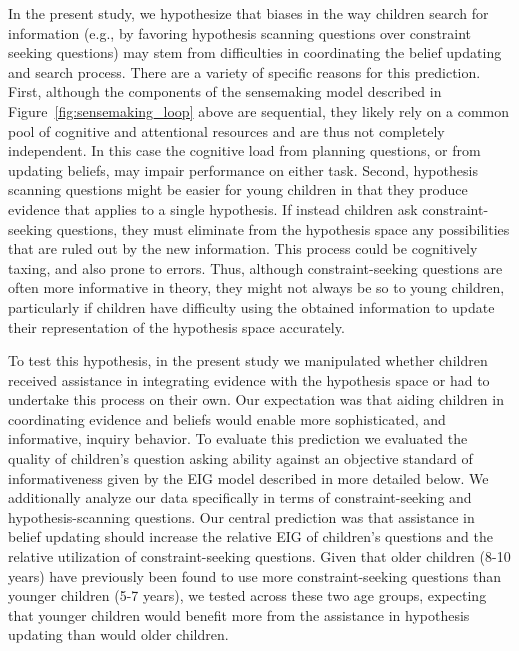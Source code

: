 \documentclass[man,floatsintext]{apa6}
\begin{document}
In the present study, we hypothesize that biases in the
way children search for information (e.g., by favoring hypothesis scanning questions over
constraint seeking questions) may stem from difficulties in coordinating the belief updating
and search process.  There are a variety of specific reasons for this prediction.  First, 
although the components of the sensemaking model described in Figure~\ref{fig:sensemaking_loop}
above are sequential, they likely rely on a common pool of cognitive and attentional resources and 
are thus not completely independent.  In this case the cognitive load from planning questions,
or from updating beliefs, may impair performance on either task.
Second, hypothesis scanning questions might be easier for young children in that they produce 
evidence that applies to a single hypothesis.  If instead children ask constraint-seeking questions, 
they must eliminate from the hypothesis space any possibilities that are ruled out by the new information. 
This process could be cognitively taxing, and also prone to errors. Thus, although constraint-seeking 
questions are often more informative in theory, they might not always be so to young children, particularly 
if children have difficulty using the obtained information to update their representation of the hypothesis 
space accurately. 

To test this hypothesis, in the present study we manipulated whether children received assistance in 
integrating evidence with the hypothesis space or had to undertake this process on their own.  Our
expectation was that aiding children in coordinating evidence and beliefs would enable more sophisticated, and informative,
inquiry behavior.  To evaluate this prediction we evaluated the quality of children's question asking ability
against an objective standard of informativeness given by the EIG model described in more detailed below.
 We additionally analyze our data specifically in terms of constraint-seeking and hypothesis-scanning questions.  
Our central prediction was that assistance in belief updating should increase the relative EIG of children's questions
and the relative utilization of constraint-seeking questions.
Given that older children (8-10 years) have previously been found to use more constraint-seeking questions than younger children (5-7 years), we tested across these two age groups, expecting that younger children
would benefit more from the assistance in hypothesis updating than would older children.
\end{document}
